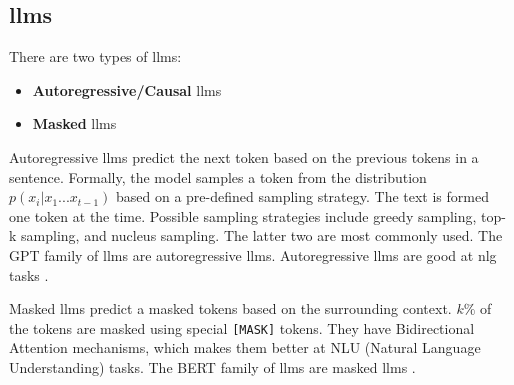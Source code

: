 \subsection{\acp{llm}}
\label{sec:llms}

There are two types of \acp{llm}:
\begin{itemize}
    \item \textbf{Autoregressive/Causal} \acp{llm}
    \item \textbf{Masked} \acp{llm}
\end{itemize}
Autoregressive \acp{llm} predict the next token based on the previous tokens in a sentence. 
Formally, the model samples a token from the distribution $p(x_i | x_1 ... x_{t-1})$ based on a pre-defined sampling strategy.
The text is formed one token at the time.
Possible sampling strategies include greedy sampling, top-k sampling, and nucleus sampling.
The latter two are most commonly used.
The GPT family of \acp{llm} are autoregressive \acp{llm}.
Autoregressive \acp{llm} are good at \ac{nlg} tasks \cite{bhattacharjee_fighting_2024}.

Masked \acp{llm} predict a masked tokens based on the surrounding context.
$k\%$ of the tokens are masked using special \texttt{[MASK]} tokens.
They have Bidirectional Attention mechanisms, which makes them better at NLU (Natural Language Understanding) tasks.
The BERT family of \acp{llm} are masked \acp{llm} \cite{bhattacharjee_fighting_2024}.